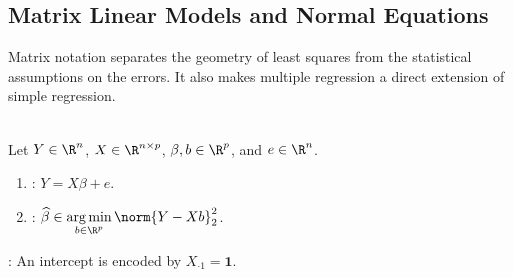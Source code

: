 \subsection{Matrix Linear Models and Normal Equations}

Matrix notation separates the geometry of least squares from the statistical assumptions on the errors.  It also makes multiple regression a direct extension of simple regression.

\begin{definition} \label{def:fixed-design-linear-model} \\
Let $Y\in\R^n$, $X\in\R^{n\times p}$, $\beta,b\in\R^p$, and $e\in\R^n$.
\begin{enumerate}[label=(\roman*)]
\setlength{\itemsep}{0pt}
\item {}: $Y=X\beta+e$.
\item {}: $\widehat{\beta}\in\operatorname*{arg\,min}\limits_{b\in\R^p}\norm{Y-Xb}_2^2$.
\end{enumerate}
: An intercept is encoded by $X_{\cdot 1}=\mathbf{1}$.
\end{definition}

